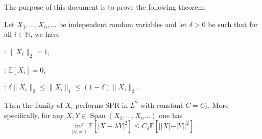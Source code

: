 \documentclass{inprogress}
\newcommand{\Span}{\operatorname{Span}}
\newcommand{\Hyp}[1]{\item[\textsc{#1}]\label{hyp:#1}\!\!\!\textsc{:}}
\begin{document}
The purpose of this document is to prove the following theorem.

\begin{theorem}
    \label{thm:goal}
    Let $X_1, \dots, X_n, \dots$ be independent random variables and let $\delta>0$ be such that for all $i\in \mathbb{N}$, we have
    \begin{hypotheses}
        \Hyp{Norm} $\|X_i\|_2 = 1$,
        \Hyp{Mean} $\mathbb E[X_i] =  0$,
        \Hyp{Equiv} $\delta \|X_i\|_2 \le \|X_i\|_1 \le (1-\delta) \|X_i\|_2$.
    \end{hypotheses}
    Then the family of $X_i$ performs SPR in $L^2$ with constant $C=C_\delta$. More specifically, for any $X, Y \in \Span(X_1, \dots, X_n \dots)$ one has \[
    \inf_{|\lambda|=1}\mathbb E[|X-\lambda Y|^2]\le C_\delta \mathbb E[||X|-|Y||^2].
    \]
\end{theorem}
\end{document}
